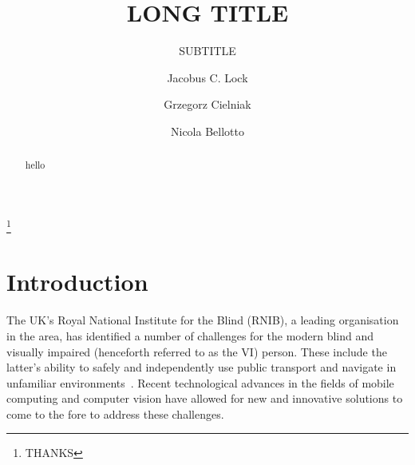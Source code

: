 \documentclass[format=sigconf, review=true, screen=true, anonymous=true]{acmart}
\begin{document}

\title[SHORT TITLE]{LONG TITLE}
\subtitle{SUBTITLE}

\author{Jacobus C. Lock}

\author{Grzegorz Cielniak}

\author{Nicola Bellotto}

\thanks{THANKS}



\maketitle

\begin{abstract}
  hello
\end{abstract}

\section{Introduction}

The UK's Royal National Institute for the Blind (RNIB), a leading organisation in the area, has identified a number of challenges for the modern blind and visually impaired (henceforth referred to as the VI) person. These include the latter's ability to safely and independently use public transport and navigate in unfamiliar environments~\cite{rnib-objectives}. Recent technological advances in the fields of mobile computing and computer vision have allowed for new and innovative solutions to come to the fore to address these challenges. 
\end{document}
